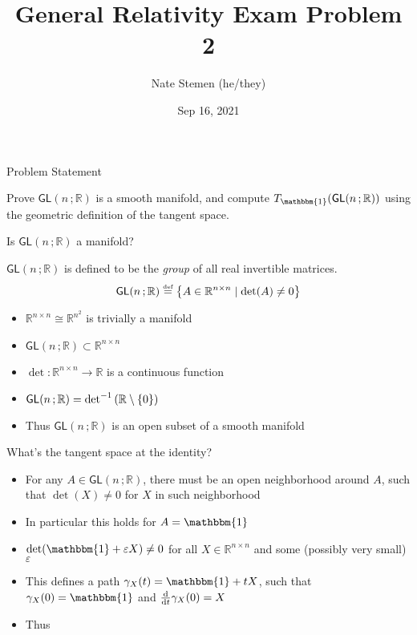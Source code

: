\documentclass[11pt,aspectratio=1610,xcolor=dvipsnames]{beamer}
\title{General Relativity Exam Problem 2}
\date{Sep 16, 2021}
\author{Nate Stemen (he/they)}
\institute{AMATH 875}
\newcommand{\GL}[2]{\mathsf{GL}(#1\,; #2)}
\newcommand{\R}{\mathbb{R}}
\newcommand{\1}{\mathbbm{1}}
\newcommand{\defeq}{\stackrel{\text{\tiny def}}{=}}
\newcommand{\problemstatement}{Prove $\GL{n}{\R}$ is a smooth manifold, and compute $T_{\1}(\GL{n}{\R})$ using the geometric definition of the tangent space.}
\begin{document}
\maketitle

\begin{frame}{Problem Statement}
	\large
	\begin{prob}
		\problemstatement
	\end{prob}
\end{frame}

\begin{frame}{Is $\GL{n}{\R}$ a manifold?}
	\begin{definition}
		$\GL{n}{\R}$ is defined to be the \emph{group} of all real invertible matrices.
		\begin{equation*}
			\GL{n}{\R} \defeq \qty{A\in \R^{n\times n} \mid \det(A) \neq 0}
		\end{equation*}
	\end{definition}
	\pause
	\begin{itemize}[<+->]
		\item $\R^{n\times n} \cong \R^{n^2}$ is trivially a manifold
		\item $\GL{n}{\R}\subset \R^{n\times n}$
		\item $\det: \R^{n\times n} \to \R$ is a continuous function
		\item $\GL{n}{\R} = \det^{-1}\qty(\R\setminus\qty{0})$
		\item Thus $\GL{n}{\R}$ is an open subset of a smooth manifold
	\end{itemize}
\end{frame}

\begin{frame}{What's the tangent space at the identity?}
	\begin{itemize}[<+->]
		\item For any $A\in\GL{n}{\R}$, there must be an open neighborhood around $A$, such that $\det(X) \neq 0$ for $X$ in such neighborhood
		\item In particular this holds for $A = \1$
		\item $\det(\1 + \varepsilon X) \neq 0$ for all $X\in\R^{n\times n}$ and some (possibly very small) $\varepsilon$
		\item This defines a path $\gamma_X(t) = \1 + tX$, such that $\gamma_X(0) = \1$ and $\dv{t}\gamma_X(0) = X$
		\item Thus \tcbox[on line,boxsep=4pt, left=0pt,right=0pt,top=0pt,bottom=0pt,colframe=white,boxrule=0pt,colback=LightLavender,highlight math style={enhanced}]{$T_\1(\GL{n}{\R}) = \R^{n\times n}$}
	\end{itemize}
\end{frame}
\end{document}
